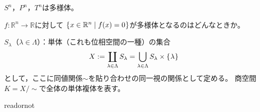 \documentclass[uplatex]{jsarticle}
\begin{document}
\begin{rei}
  $S^{n}$，$P^{n}$，$T^{n}$は多様体。
\end{rei}

$f \colon \mathbb{R}^{n} \longrightarrow \mathbb{R}$に対して
$\Set{\hspace{-1.8pt} x \in \mathbb{R}^{n} | f(x) = 0 \hspace{-1.8pt}}$が多様体となるのはどんなときか。

\begin{rei}[単体複体]
  $S_{\lambda}$（$\lambda \in \Lambda$）：単体（これも位相空間の一種）の集合
  \begin{equation}
    X := \coprod_{\lambda \in \Lambda} S_{\lambda} = \bigcup_{\lambda \in \Lambda} S_{\lambda} \times \Set{\hspace{-1.8pt} \lambda \hspace{-1.8pt}}
  \end{equation}
  として，ここに同値関係$\sim$を貼り合わせの同一視の関係として定める。
  商空間$K = X / \sim$で全体の単体複体を表す。
\end{rei}

\expandafter\ifx\csname readornot\endcsname\relax
  
\end{document}
